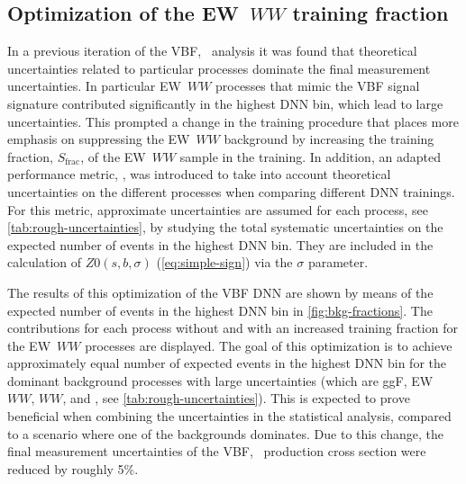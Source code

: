 \subsection{Optimization of the EW~$WW$ training fraction}
\label{app:sec:ewww-sample-fraction-optimization}
In a previous iteration of the VBF, \HWW\ analysis it was found that theoretical uncertainties related to particular processes dominate the final measurement uncertainties. In particular EW~$WW$ processes that mimic the VBF signal signature contributed significantly in the highest DNN bin, which lead to large uncertainties.
This prompted a change in the training procedure that places more emphasis on suppressing the EW~$WW$ background by increasing the training fraction, $S_\mathrm{frac}$, of the EW~$WW$ sample in the training.
In addition, an adapted performance metric, \ZVBFunc, was introduced to take into account theoretical uncertainties on the different processes when comparing different DNN trainings.
For this metric, approximate uncertainties are assumed for each process, see \cref{tab:rough-uncertainties}, by studying the total systematic uncertainties on the expected number of events in the highest DNN bin. They are included in the calculation of $Z0(s, b, \sigma)$ (\cref{eq:simple-sign}) via the $\sigma$ parameter.

The results of this optimization of the VBF DNN are shown by means of the expected number of events in the highest DNN bin in \cref{fig:bkg-fractions}. The contributions for each process without and with an increased training fraction for the EW~$WW$ processes are displayed.
The goal of this optimization is to achieve approximately equal number of expected events in the highest DNN bin for the dominant background processes with large uncertainties (which are ggF, EW~$WW$, $WW$, and \ttbar, see \cref{tab:rough-uncertainties}).
This is expected to prove beneficial when combining the uncertainties in the statistical analysis, compared to a scenario where one of the backgrounds dominates.
Due to this change, the final measurement uncertainties of the VBF, \HWW\ production cross section were reduced by roughly 5\%. 

